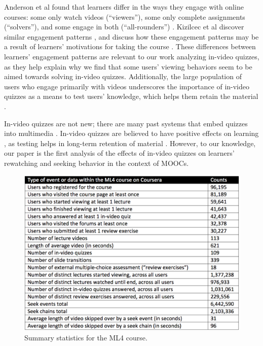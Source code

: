 \documentclass{sigchi}
\begin{document}
Anderson et al found that learners differ in the ways they engage with online courses: some only watch videos (``viewers''), some only complete assignments (``solvers''), and some engage in both (``all-rounders'') \cite{ashton}. Kizilcec et al discover similar engagement patterns \cite{renedisengagement}, and discuss how these engagement patterns may be a result of learners' motivations for taking the course \cite{renemotivation}. These differences between learners' engagement patterns are relevant to our work analyzing in-video quizzes, as they help explain why we find that some users' viewing behaviors seem to be aimed towards solving in-video quizzes. Additionally, the large population of users who engage primarily with videos underscores the importance of in-video quizzes as a means to test users' knowledge, which helps them retain the material \cite{testingeffect}. %


In-video quizzes are not new; there are many past systems that embed quizzes into multimedia \cite{multimedia}. In-video quizzes are believed to have positive effects on learning \cite{embedded}, as testing helps in long-term retention of material \cite{testingeffect}. However, to our knowledge, our paper is the first analysis of the effects of in-video quizzes on learners' rewatching and seeking behavior in the context of MOOCs.

\begin{figure}
\includegraphics[width=1.0\columnwidth]{summary-statistics}
\caption{Summary statistics for the ML4 course.}
\label{fig:summary-statistics}
\end{figure}
\end{document}

